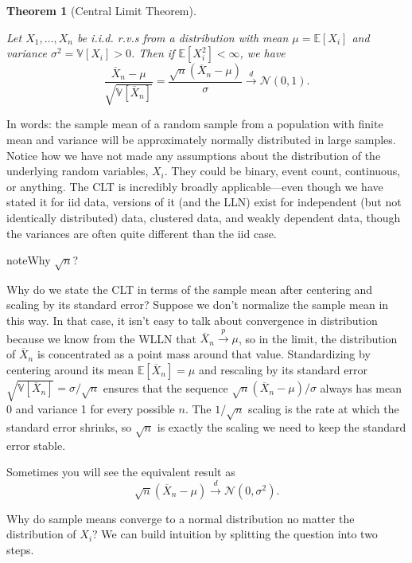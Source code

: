 \documentclass[
  13pt,
  letterpaper,
  DIV=11,
  numbers=noendperiod]{scrreprt}
\newcommand{\E}{\mathbb{E}}
\newcommand{\V}{\mathbb{V}}
\newcommand{\N}{\mathcal{N}}
\newcommand{\Xbar}{\overline{X}}
\newcommand{\inprob}{\overset{p}{\to}}
\newcommand{\indist}{\overset{d}{\to}}
\theoremstyle{plain}
\newtheorem{theorem}{Theorem}[chapter]
\theoremstyle{plain}
\theoremstyle{definition}
\theoremstyle{definition}
\theoremstyle{remark}
\begin{document}
\begin{theorem}[Central Limit
Theorem]\protect\hypertarget{thm-clt}{}\label{thm-clt}

Let \(X_1, \ldots, X_n\) be i.i.d. r.v.s from a distribution with mean
\(\mu = \E[X_i]\) and variance \(\sigma^2 = \V[X_i] > 0\). Then if
\(\E[X_i^2] < \infty\), we have \[
\frac{\Xbar_n - \mu}{\sqrt{\V[\Xbar_n]}} = \frac{\sqrt{n}\left(\Xbar_n - \mu\right)}{\sigma} \indist \N(0, 1).
\]

\end{theorem}

In words: the sample mean of a random sample from a population with
finite mean and variance will be approximately normally distributed in
large samples. Notice how we have not made any assumptions about the
distribution of the underlying random variables, \(X_i\). They could be
binary, event count, continuous, or anything. The CLT is incredibly
broadly applicable---even though we have stated it for iid data,
versions of it (and the LLN) exist for independent (but not identically
distributed) data, clustered data, and weakly dependent data, though the
variances are often quite different than the iid case.

\begin{bookcallout}{note}{Why \(\sqrt{n}\)?}

Why do we state the CLT in terms of the sample mean after centering and
scaling by its standard error? Suppose we don't normalize the sample
mean in this way. In that case, it isn't easy to talk about convergence
in distribution because we know from the WLLN that
\(\Xbar_n \inprob \mu\), so in the limit, the distribution of
\(\Xbar_n\) is concentrated as a point mass around that value.
Standardizing by centering around its mean \(\E[\Xbar_n] = \mu\) and
rescaling by its standard error
\(\sqrt{\V[\Xbar_n]} = \sigma / \sqrt{n}\) ensures that the sequence
\(\sqrt{n}(\Xbar_n - \mu)/\sigma\) always has mean 0 and variance 1 for
every possible \(n\). The \(1/\sqrt{n}\) scaling is the rate at which
the standard error shrinks, so \(\sqrt{n}\) is exactly the scaling we
need to keep the standard error stable.

Sometimes you will see the equivalent result as \[
\sqrt{n}\left(\Xbar_n - \mu\right) \indist \N(0, \sigma^2).
\]

\end{bookcallout}

Why do sample means converge to a normal distribution no matter the
distribution of \(X_i\)? We can build intuition by splitting the
question into two steps.
\end{document}
